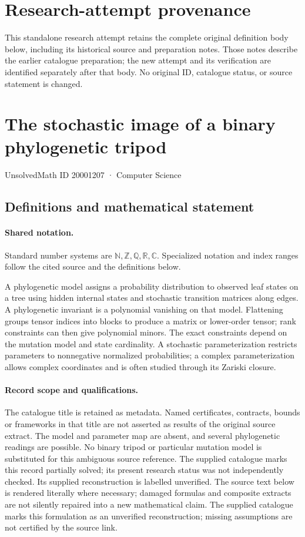 \documentclass[11pt]{article}
\begin{document}
\section*{Research-attempt provenance}
This standalone research attempt retains the complete original definition body below,
including its historical source and preparation notes. Those notes describe the
earlier catalogue preparation; the new attempt and its verification are identified
separately after that body. No original ID, catalogue status, or source statement is changed.

\section{The stochastic image of a binary phylogenetic tripod}\label{20001207}
{\small UnsolvedMath ID 20001207 · Computer Science}
\subsection{Definitions and mathematical statement}

\paragraph{Shared notation.}Standard number systems are $\mathbb N,\mathbb Z,\mathbb Q,\mathbb R,\mathbb C$. Specialized notation and index ranges follow the cited source and the definitions below.


A phylogenetic model assigns a probability distribution to observed leaf states on a tree using hidden internal states and stochastic transition matrices along edges. A phylogenetic invariant is a polynomial vanishing on that model. Flattening groups tensor indices into blocks to produce a matrix or lower-order tensor; rank constraints can then give polynomial minors. The exact constraints depend on the mutation model and state cardinality. A stochastic parameterization restricts parameters to nonnegative normalized probabilities; a complex parameterization allows complex coordinates and is often studied through its Zariski closure.
\paragraph{Record scope and qualifications.}
The catalogue title is retained as metadata. Named certificates, contracts, bounds or frameworks in that title are not asserted as results of the original source extract.
The model and parameter map are absent, and several phylogenetic readings are possible. No binary tripod or particular mutation model is substituted for this ambiguous source reference. The supplied catalogue marks this record partially solved; its present research status was not independently checked. Its supplied reconstruction is labelled unverified.
The source text below is rendered literally where necessary; damaged formulas and composite extracts are not silently repaired into a new mathematical claim.
The supplied catalogue marks this formulation as an unverified reconstruction; missing assumptions are not certified by the source link.
\end{document}
